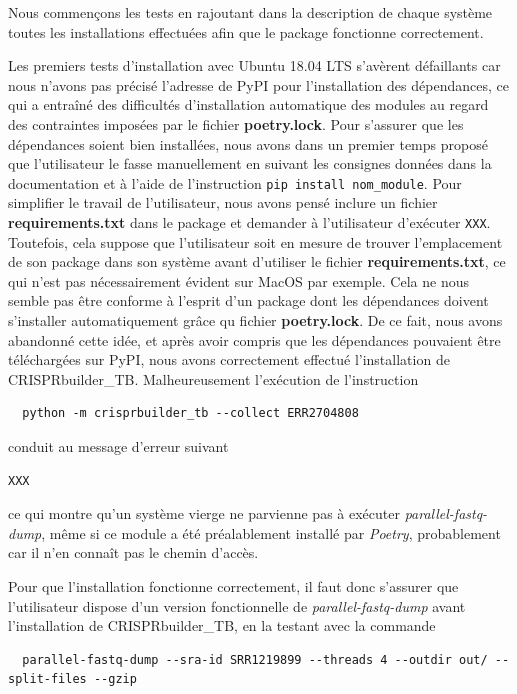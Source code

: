 \documentclass[twoside,a4paper,11pt,frenchb,openany]{report}
\begin{document}
Nous commençons les tests en rajoutant dans la description de chaque système toutes les installations effectuées afin que le package fonctionne correctement.

Les premiers tests d'installation avec Ubuntu 18.04 LTS s'avèrent défaillants car nous n'avons pas précisé l'adresse de PyPI pour l'installation des dépendances, ce qui a entraîné des difficultés d'installation automatique des modules au regard des contraintes imposées par le fichier \textbf{poetry.lock}. Pour s'assurer que les dépendances soient bien installées, nous avons dans un premier temps proposé que l'utilisateur le fasse manuellement en suivant les consignes données dans la documentation et à l'aide de l'instruction \texttt{pip install nom\_module}. Pour simplifier le travail de l'utilisateur, nous avons pensé inclure un fichier \textbf{requirements.txt} dans le package et demander à l'utilisateur d'exécuter \texttt{XXX}. Toutefois, cela suppose que l'utilisateur soit en mesure de trouver l'emplacement de son package dans son système avant d'utiliser le fichier \textbf{requirements.txt}, ce qui n'est pas nécessairement évident sur MacOS par exemple. Cela ne nous semble pas être conforme à l'esprit d'un package dont les dépendances doivent s'installer automatiquement grâce qu fichier \textbf{poetry.lock}. De ce fait, nous avons abandonné cette idée, et après avoir compris que les dépendances pouvaient être téléchargées sur PyPI, nous avons correctement effectué l'installation de CRISPRbuilder\_TB. Malheureusement l'exécution de l'instruction

\begin{verbatim}
  python -m crisprbuilder_tb --collect ERR2704808
\end{verbatim}

conduit au message d'erreur suivant

\begin{verbatim}
XXX
\end{verbatim}

ce qui montre qu'un système vierge ne parvienne pas à exécuter \textit{parallel-fastq-dump}, même si ce module a été préalablement installé par \textit{Poetry}, probablement car il n'en connaît pas le chemin d'accès.

Pour que l'installation fonctionne correctement, il faut donc s'assurer que l'utilisateur dispose d'un version fonctionnelle de \textit{parallel-fastq-dump} avant l'installation de CRISPRbuilder\_TB, en la testant avec la commande 

\begin{verbatim}
  parallel-fastq-dump --sra-id SRR1219899 --threads 4 --outdir out/ --split-files --gzip
\end{verbatim} 
\end{document}
